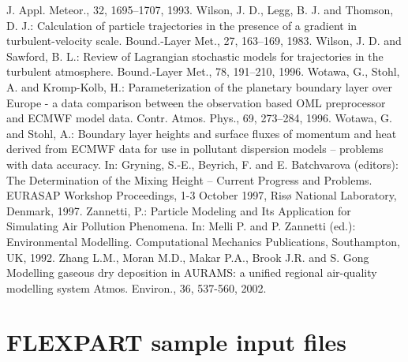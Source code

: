 \documentclass{egu}            %
\begin{document}
\begin{thebibliography}{}
J. Appl. Meteor., 32, 1695--1707, 1993.
Wilson, J. D., Legg, B. J. and Thomson, D. J.:
Calculation of particle trajectories in the presence of a gradient in turbulent-velocity scale.
Bound.-Layer Met., 27, 163--169, 1983.
Wilson, J. D. and Sawford, B. L.:
Review of Lagrangian stochastic models for trajectories in the turbulent atmosphere.
Bound.-Layer Met., 78, 191--210, 1996.
Wotawa, G., Stohl, A. and Kromp-Kolb, H.:
Parameterization of the planetary boundary layer over Europe - a data comparison between the observation based OML preprocessor and ECMWF model data.
Contr. Atmos. Phys., 69, 273--284, 1996.
Wotawa, G. and Stohl, A.:
Boundary layer heights and surface fluxes of momentum and heat derived from ECMWF data for use in pollutant dispersion models -- problems with data accuracy.
In: Gryning, S.-E., Beyrich, F. and E. Batchvarova (editors): The Determination of the Mixing Height -- Current Progress and Problems. EURASAP Workshop Proceedings, 1-3 October 1997, Ris{\o} National Laboratory, Denmark, 1997.
Zannetti, P.:
Particle Modeling and Its Application for Simulating Air Pollution Phenomena. In: Melli P. and P. Zannetti (ed.): Environmental Modelling. Computational Mechanics Publications, Southampton, UK, 1992.
Zhang L.M., Moran M.D., Makar P.A., Brook J.R. and S. Gong
Modelling gaseous dry deposition in AURAMS: a unified regional air-quality modelling system 
Atmos. Environ., 36, 537-560, 2002.

\end{thebibliography}

\newpage

\appendix

\onecolumn

\section{FLEXPART sample input files}
\end{document}

